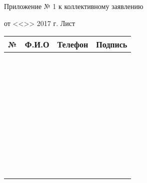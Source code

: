 \documentclass[a4paper,12pt]{extarticle}
\begin{document}
	\newpage
	\begin{center}
		Приложение № 1 к коллективному заявлению
	\end{center}

	от <<\makebox[0.75cm]{\hrulefill}>> \makebox[2cm]{\hrulefill} 2017 г. \hfill Лист \makebox[0.75cm]{\hrulefill}

	\begin{center}
		\begin{tabular}{|p{0.5cm}|p{6cm}|p{6cm}|p{3cm}|}
			\hline
			№ & Ф.И.О & Телефон & Подпись \\
			\hline&&&\\
			\hline&&&\\
			\hline&&&\\
			\hline&&&\\
			\hline&&&\\
			\hline&&&\\
			\hline&&&\\
			\hline&&&\\
			\hline&&&\\
			\hline&&&\\
			\hline&&&\\
			\hline&&&\\
			\hline&&&\\
			\hline&&&\\
			\hline&&&\\
			\hline&&&\\
			\hline&&&\\
			\hline&&&\\
			\hline&&&\\
			\hline&&&\\
			\hline&&&\\
			\hline&&&\\
			\hline&&&\\
			\hline&&&\\
			\hline&&&\\
			\hline&&&\\
			\hline&&&\\
			\hline&&&\\
			\hline&&&\\
			\hline&&&\\
			\hline&&&\\
			\hline&&&\\
			\hline&&&\\
			\hline&&&\\
			\hline&&&\\
			\hline&&&\\
			\hline&&&\\
			\hline&&&\\
			\hline&&&\\
			\hline&&&\\
			\hline&&&\\
			\hline&&&\\
			\hline
		\end{tabular}
	\end{center}
\end{document}
